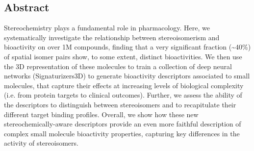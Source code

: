 \subsection{Abstract}

Stereochemistry plays a fundamental role in pharmacology. Here, we systematically investigate the relationship between stereoisomerism and bioactivity on over 1M compounds, finding that a very significant fraction (\textasciitilde40\%) of spatial isomer pairs show, to some extent, distinct bioactivities. We then use the 3D representation of these molecules to train a collection of deep neural networks (Signaturizers3D) to generate bioactivity descriptors associated to small molecules, that capture their effects at increasing levels of biological complexity (i.e. from protein targets to clinical outcomes). Further, we assess the ability of the descriptors to distinguish between stereoisomers and to recapitulate their different target binding profiles. Overall, we show how these new stereochemically-aware descriptors provide an even more faithful description of complex small molecule bioactivity properties, capturing key differences in the activity of stereoisomers.



